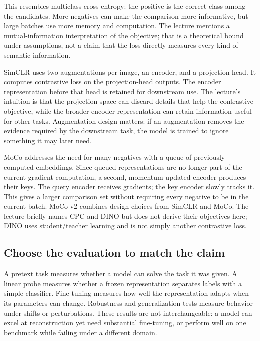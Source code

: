 This resembles multiclass cross-entropy: the positive is the correct class among the candidates. More negatives can make the comparison more informative, but large batches use more memory and computation. The lecture mentions a mutual-information interpretation of the objective; that is a theoretical bound under assumptions, not a claim that the loss directly measures every kind of semantic information.

SimCLR uses two augmentations per image, an encoder, and a projection head. It computes contrastive loss on the projection-head outputs. The encoder representation before that head is retained for downstream use. The lecture's intuition is that the projection space can discard details that help the contrastive objective, while the broader encoder representation can retain information useful for other tasks. Augmentation design matters: if an augmentation removes the evidence required by the downstream task, the model is trained to ignore something it may later need.

MoCo addresses the need for many negatives with a queue of previously computed embeddings. Since queued representations are no longer part of the current gradient computation, a second, momentum-updated encoder produces their keys. The query encoder receives gradients; the key encoder slowly tracks it. This gives a larger comparison set without requiring every negative to be in the current batch. MoCo v2 combines design choices from SimCLR and MoCo. The lecture briefly names CPC and DINO but does not derive their objectives here; DINO uses student/teacher learning and is not simply another contrastive loss.

\subsection{Choose the evaluation to match the claim}\label{04-visual-computing-ii-ch031-choose-the-evaluation-to-match-the-claim}

A pretext task measures whether a model can solve the task it was given. A linear probe measures whether a frozen representation separates labels with a simple classifier. Fine-tuning measures how well the representation adapts when its parameters can change. Robustness and generalization tests measure behavior under shifts or perturbations. These results are not interchangeable: a model can excel at reconstruction yet need substantial fine-tuning, or perform well on one benchmark while failing under a different domain.

